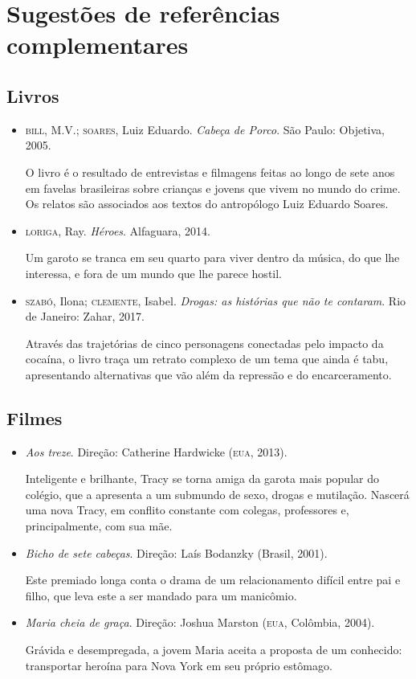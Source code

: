 \documentclass[12pt]{extarticle}
\begin{document}
\section{Sugestões de referências complementares}\label{sugestoes}

\subsection{Livros}

\begin{itemize}
\item\textsc{bill}, M.V.; \textsc{soares}, Luiz Eduardo. \textit{Cabeça de Porco}. São Paulo: Objetiva, 2005.

O livro é o resultado de entrevistas e filmagens feitas ao longo de sete
anos em favelas brasileiras sobre crianças e jovens que vivem no mundo
do crime. Os relatos são associados aos textos do antropólogo Luiz
Eduardo Soares.

\item\textsc{loriga}, Ray. \textit{Héroes}. Alfaguara, 2014.

Um garoto se tranca em seu quarto para viver dentro da música, do que
lhe interessa, e fora de um mundo que lhe parece hostil.

\item\textsc{szabó}, Ilona; \textsc{clemente}, Isabel. \textit{Drogas: as histórias que não te contaram}. Rio de Janeiro: Zahar, 2017.

Através das trajetórias de cinco personagens conectadas pelo impacto da
cocaína, o livro traça um retrato complexo de um tema que ainda é tabu,
apresentando alternativas que vão além da repressão e do encarceramento.
\end{itemize}

\subsection{Filmes}

\begin{itemize}
\item\textit{Aos treze}. Direção: Catherine Hardwicke (\textsc{eua}, 2013).

Inteligente e brilhante, Tracy se torna amiga da garota mais popular do
colégio, que a apresenta a um submundo de sexo, drogas e mutilação.
Nascerá uma nova Tracy, em conflito constante com colegas, professores
e, principalmente, com sua mãe.

\item\textit{Bicho de sete cabeças}. Direção: Laís Bodanzky (Brasil, 2001).

Este premiado longa conta o drama de um relacionamento difícil entre pai
e filho, que leva este a ser mandado para um manicômio.

\item\textit{Maria cheia de graça}. Direção: Joshua Marston (\textsc{eua}, Colômbia, 2004).

Grávida e desempregada, a jovem Maria aceita a proposta de um conhecido:
transportar heroína para Nova York em seu próprio estômago.
\end{itemize}
\end{document}
